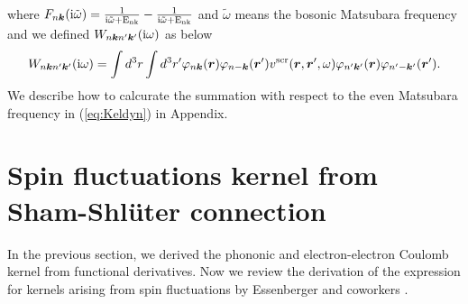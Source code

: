 %
where $F_{n\bm k}({\rm i}\tilde\omega) = 
\frac{1}{\rm i \tilde\omega + E_{n\bm k}}-\frac{1}{\rm i \tilde\omega + E_{n\bm k}}$
and $\tilde\omega$ means the bosonic Matsubara frequency and we defined 
$W_{n\bm kn'\bm k'}({\rm i}\omega)$ as below
%
\begin{equation}
	W_{n\bm kn'\bm k'}({\rm i}\omega) = 
	\int d^3r \int d^3r' \varphi_{n\bm k}(\bm r)\varphi_{n-\bm k}({\bm r'})
	v^{\rm scr}(\bm r, {\bm r'}, \omega) \varphi_{n'\bm k'}(\bm r) \varphi_{n'-\bm k'}({\bm r'}).
	\label{eq:dynWnknk}
\end{equation}
%
We describe how to calcurate the summation with respect to the even Matsubara frequency in (\ref{eq:Keldyn})
in Appendix.

\section{Spin fluctuations kernel from Sham-Shl\"{u}ter connection}
In the previous section, we derived the phononic and 
electron-electron Coulomb kernel from functional derivatives.
Now we review the derivation of the expression for kernels arising 
from spin fluctuations by Essenberger and coworkers
\cite{Essenberger2014}.

